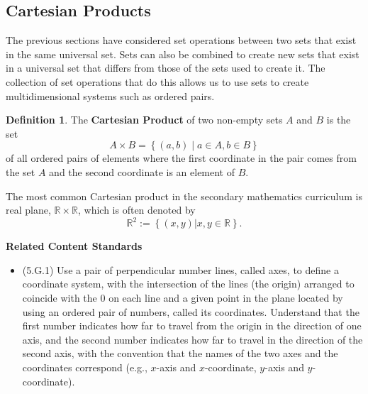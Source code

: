 \documentclass[
]{book}
\providecommand{\tightlist}{%
  \setlength{\itemsep}{0pt}\setlength{\parskip}{0pt}}
\newenvironment{standards}{}{}
\theoremstyle{definition}
\newtheorem{definition}{Definition}[chapter]
\theoremstyle{definition}
\theoremstyle{definition}
\theoremstyle{definition}
\theoremstyle{remark}
\begin{document}
\hypertarget{cartesian}{%
\subsection{Cartesian Products}\label{cartesian}}

The previous sections have considered set operations between two sets that exist in the same universal set. Sets can also be combined to create new sets that exist in a universal set that differs from those of the sets used to create it. The collection of set operations that do this allows us to use sets to create multidimensional systems such as ordered pairs.

\begin{definition}
\protect\hypertarget{def:cartesian-product}{}\label{def:cartesian-product}The \textbf{Cartesian Product} of two non-empty sets \(A\) and \(B\) is the set
\[A\times B = \left\{ (a,b) \middle \vert a \in A, b\in B\right\}\] of all ordered pairs of elements where the first coordinate in the pair comes from the set \(A\) and the second coordinate is an element of \(B\).
\end{definition}

The most common Cartesian product in the secondary mathematics curriculum is real plane, \(\mathbb{R} \times \mathbb{R}\), which is often denoted by \[\mathbb{R}^2:= \left\{ (x,y) \vert x,y\in \mathbb{R} \right\}.\]

\begin{standards}

\begin{center}
\textbf{Related Content Standards}

\end{center}

\begin{itemize}
\tightlist
\item
  (5.G.1) Use a pair of perpendicular number lines, called axes, to define a coordinate system, with the intersection of the lines (the origin) arranged to coincide with the \(0\) on each line and a given point in the plane located by using an ordered pair of numbers, called its coordinates. Understand that the first number indicates how far to travel from the origin in the direction of one axis, and the second number indicates how far to travel in the direction of the second axis, with the convention that the names of the two axes and the coordinates correspond (e.g., \(x\)-axis and \(x\)-coordinate, \(y\)-axis and \(y\)-coordinate).
\end{itemize}

\end{standards}
\end{document}
